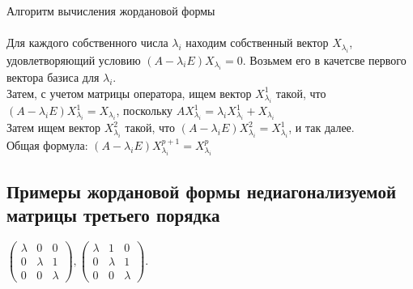 \documentclass[12pt]{article}
\begin{document}
    Алгоритм вычисления жордановой формы\\\\
    Для каждого собственного числа \(\lambda_i\) находим собственный вектор \(X_{\lambda_i}\), удовлетворяющий условию \((A - \lambda_iE)X_{\lambda_i} = 0\). Возьмем его в качетсве первого вектора базиса для \(\lambda_i\). \\
    Затем, с учетом матрицы оператора, ищем вектор \(X_{\lambda_i}^1\) такой, что \((A - \lambda_iE)X_{\lambda_i}^1 = X_{\lambda_i}\), поскольку \(AX_{\lambda_i}^1 = \lambda_iX_{\lambda_i}^1 + X_{\lambda_i}\)\\
    Затем ищем вектор \(X_{\lambda_i}^2\) такой, что \((A - \lambda_iE)X_{\lambda_i}^2 = X_{\lambda_i}^1\), и так далее.\\
    Общая формула: \((A - \lambda_iE)X_{\lambda_i}^{p+1} = X_{\lambda_i}^p\)\\

    \subsection{Примеры жордановой формы недиагонализуемой матрицы третьего порядка}
    $
        \begin{pmatrix}
            \lambda & 0       & 0       \\
            0       & \lambda & 1       \\
            0       & 0       & \lambda
        \end{pmatrix},
        \begin{pmatrix}
            \lambda & 1       & 0       \\
            0       & \lambda & 1       \\
            0       & 0       & \lambda
        \end{pmatrix}$.
\end{document}
